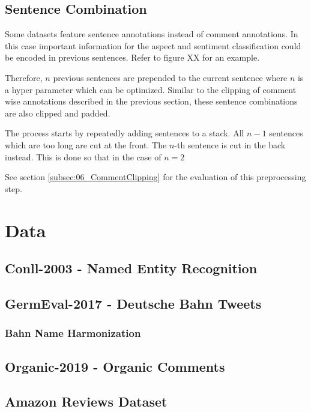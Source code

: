 \subsection{Sentence Combination}

Some datasets feature sentence annotations instead of comment annotations. In this case important information for the aspect and sentiment classification could be encoded in previous sentences. Refer to figure XX for an example.

Therefore, $n$ previous sentences are prepended to the current sentence where $n$ is a hyper parameter which can be optimized. Similar to the clipping of comment wise annotations described in the previous section, these sentence combinations are also clipped and padded. 

The process starts by repeatedly adding sentences to a stack. All $n-1$ sentences which are too long are cut at the front. The $n$-th sentence is cut in the back instead. This is done so that in the case of $n=2$ 


See section \ref{subsec:06_CommentClipping} for the evaluation of this preprocessing step.

\section{Data}
\label{sec:05_Data}


\subsection{Conll-2003 - Named Entity Recognition}
\subsection{GermEval-2017 - Deutsche Bahn Tweets}
\subsubsection*{Bahn Name Harmonization}
\subsection{Organic-2019 - Organic Comments}
\subsection{Amazon Reviews Dataset}

